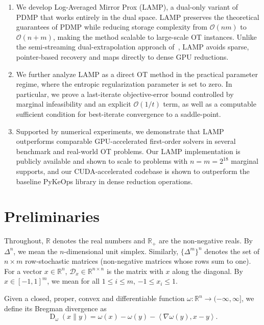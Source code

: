 \documentclass[10pt]{article}
\newcommand{\R}{\mathbb{R}}
\renewcommand{\O}{\mathcal{O}}
\newcommand{\inner}[2]{\left\langle #1,#2\right\rangle}
\newcommand{\Rp}{\R_{+}}
\newcommand{\D}{\operatorname{D}}
\newcommand{\diag}[1]{\mathcal{D}_{#1}}
\theoremstyle{plain}
\theoremstyle{definition}
\theoremstyle{remark}
\begin{document}
\begin{enumerate}
    \item We develop Log-Averaged Mirror Prox (LAMP), a dual-only variant of PDMP that works entirely in the dual space. LAMP preserves the theoretical guarantees of PDMP while reducing storage complexity from $\O(nm)$ to  $\mathcal{O}(n+m)$, making the method scalable to large-scale OT instances. Unlike the semi-streaming dual-extrapolation approach of~\cite{assadiSemiStreamingBipartiteMatching2022}, LAMP avoids sparse, pointer-based recovery and maps directly to dense GPU reductions.
    \item We further analyze LAMP as a direct OT method in the practical parameter regime, where the entropic regularization parameter is set to zero.
    In particular, we prove a last-iterate objective-error bound controlled by marginal infeasibility and an explicit $\mathcal{O}(1/t)$ term, as well as a computable sufficient condition for best-iterate convergence to a saddle-point. 
    \item Supported by numerical experiments, we demonstrate that LAMP outperforms comparable GPU-accelerated first-order solvers in several benchmark and real-world OT problems. Our LAMP implementation is publicly available and shown to scale to problems with $n=m=2^{18}$ marginal supports, and our CUDA-accelerated codebase is shown to outperform the baseline PyKeOps library in dense reduction operations.
\end{enumerate}


\section{Preliminaries}
Throughout, $\R$ denotes the real numbers and $\Rp$ are the non-negative reals. By $\Delta^n$, we mean the $n$-dimensional unit simplex. Similarly, $\{\Delta^m\}^n$ denotes the set of $n\times m$ row-stochastic matrices (non-negative matrices whose rows sum to one). For a vector $x\in\R^n$, $\diag{x}\in\R^{n\times n}$ is the matrix with $x$ along the diagonal. By $x\in[-1,1]^m$, we mean for all $1\leq i\leq m$, $-1\leq x_{i}\leq 1$.

Given a closed, proper, convex and differentiable function $\omega:\R^n\to(-\infty,\infty]$, we define its Bregman divergence as
\begin{equation*}
    \D_\omega(x\|y)=\omega(x)-\omega(y)-\inner{\nabla \omega(y)}{x-y}.
\end{equation*}
\end{document}
